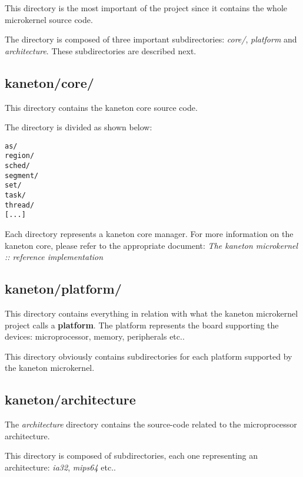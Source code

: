 This directory is the most important of the project since it contains
the whole microkernel source code.

The directory is composed of three important subdirectories: \textit{core/},
\textit{platform} and \textit{architecture}. These subdirectories are described
next.

%
%

\subsection*{kaneton/core/}

This directory contains the kaneton core source code.

The directory is divided as shown below:

\begin{verbatim}
as/
region/
sched/
segment/
set/
task/
thread/
[...]
\end{verbatim}

Each directory represents a kaneton core manager. For more information on
the kaneton core, please refer to the appropriate document:
\textit{The kaneton microkernel :: reference implementation}

%
%

\subsection*{kaneton/platform/}

This directory contains everything in relation with what the kaneton
microkernel project calls a \textbf{platform}. The platform represents the
board supporting the devices: microprocessor, memory, peripherals etc..

This directory obviously contains subdirectories for each platform
supported by the kaneton microkernel.

%
%

\subsection*{kaneton/architecture}

The \textit{architecture} directory contains the source-code related to
the microprocessor architecture.

This directory is composed of subdirectories, each one representing an
architecture: \textit{ia32}, \textit{mips64} etc..

%
%

